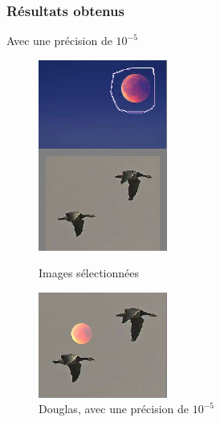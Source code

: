 \subsubsection{Résultats obtenus}
Avec une précision de $10^{-5}$

\begin{figure}[!htb]
   \begin{minipage}{0.5\textwidth}
     \centering
     \includegraphics[width = 120pt]{Images/Resultats/LuneOiseau.png}
     \caption{Images sélectionnées}
      \end{minipage}\hfill
   \begin{minipage}{0.5\textwidth}
     \centering
     \includegraphics[width = 120pt]{Images/Resultats/Douglas1.png}
     \caption{Douglas, avec une précision de $10^{-5}$}
      \end{minipage}\hfill
\end{figure}
